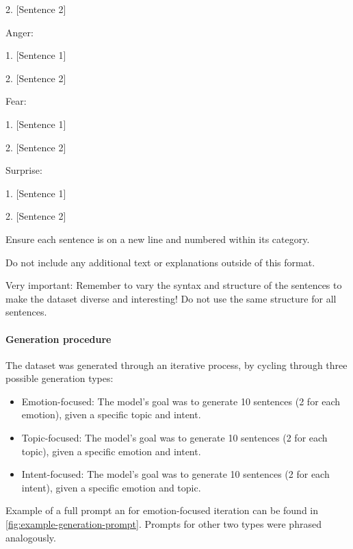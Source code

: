 \begin{figure*}
\begin{tcolorbox}
2. [Sentence 2]

\smallskip
Anger:

1. [Sentence 1]

2. [Sentence 2]

\smallskip
Fear:

1. [Sentence 1]

2. [Sentence 2]

\smallskip

Surprise:

1. [Sentence 1]

2. [Sentence 2]

\medskip
Ensure each sentence is on a new line and numbered within its category.

Do not include any additional text or explanations outside of this format.

Very important: Remember to vary the syntax and structure of the sentences to make the dataset diverse and interesting! Do not use the same structure for all sentences.

\end{tcolorbox}
    \caption{Example prompt configuration used in generating the synthetic dataset (emotion-focused type). Text highlighted in \textbf{bold} represents parts of the prompt that were varied on each iteration to increase diversity of resulting sentences.}
    \label{fig:example-generation-prompt}
\end{figure*}




\paragraph{Generation procedure}

The dataset was generated through an iterative process, by cycling through three possible generation types:

\begin{itemize}
\item Emotion-focused: The model's goal was to generate 10 sentences (2 for each emotion), given a specific topic and intent.
\item Topic-focused: The model's goal was to generate 10 sentences (2 for each topic), given a specific emotion and intent.
\item Intent-focused: The model's goal was to generate 10 sentences (2 for each intent), given a specific emotion and topic.
\end{itemize}

Example of a full prompt an for emotion-focused iteration can be found in \cref{fig:example-generation-prompt}. Prompts for other two types were phrased analogously.

